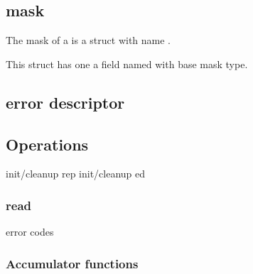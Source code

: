 \subsection{\csm{} mask}
The \csm{} mask of a \struct{}  is a \C{} struct 
with name .  

This struct has one 
a field named  with base 
\csm{} mask type.  

\subsection{error descriptor}
\subsection{Operations}
init/cleanup rep
init/cleanup ed
\subsubsection{read}
  error codes
\subsubsection{Accumulator functions}

